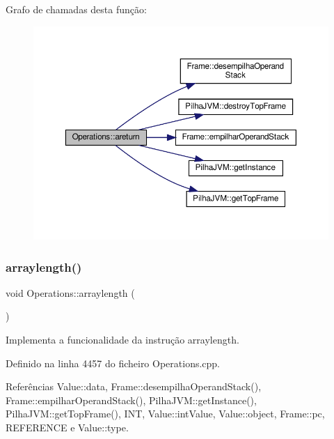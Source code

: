 Grafo de chamadas desta função\+:\nopagebreak
\begin{figure}[H]
\begin{center}
\leavevmode
\includegraphics[width=350pt]{classOperations_a5829421b72f92d50dea0461953b26c5b_cgraph}
\end{center}
\end{figure}
\mbox{\label{classOperations_ae01c8bce2d6a583151dc0e46d1b8d52f}} 
\subsubsection{\texorpdfstring{arraylength()}{arraylength()}}
{\footnotesize\ttfamily void Operations\+::arraylength (\begin{DoxyParamCaption}{ }\end{DoxyParamCaption})\hspace{0.3cm}{\ttfamily [private]}}



Implementa a funcionalidade da instrução arraylength. 



Definido na linha 4457 do ficheiro Operations.\+cpp.



Referências Value\+::data, Frame\+::desempilha\+Operand\+Stack(), Frame\+::empilhar\+Operand\+Stack(), Pilha\+J\+V\+M\+::get\+Instance(), Pilha\+J\+V\+M\+::get\+Top\+Frame(), I\+NT, Value\+::int\+Value, Value\+::object, Frame\+::pc, R\+E\+F\+E\+R\+E\+N\+CE e Value\+::type.



